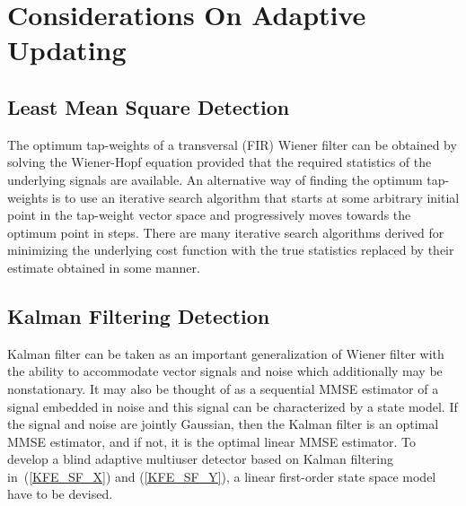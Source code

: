 \documentclass[a4paper,11pt,fleqn]{article}
\begin{document}
\pagebreak

\section{ Considerations On Adaptive Updating}

\begin{figure}
\label{AMUDstruct}
\end{figure}

\subsection{Least Mean Square Detection}

The optimum tap-weights of a transversal (FIR) Wiener filter can
be obtained by solving the Wiener-Hopf equation provided that the
required statistics of the underlying signals are available. An
alternative way of finding the optimum tap-weights is to use an
iterative search algorithm that starts at some arbitrary initial
point in the tap-weight vector space and progressively moves
towards the optimum point in steps. There are many iterative
search algorithms derived for minimizing the underlying cost
function with the true statistics replaced by their estimate
obtained in some manner.



\subsection{Kalman Filtering Detection} Kalman filter can be
taken as an important generalization of Wiener filter with the
ability to accommodate vector signals and noise which additionally
may be nonstationary. It may also be thought of as a sequential
MMSE estimator of a signal embedded in noise and this signal can
be characterized by a state model. If the signal and noise are
jointly Gaussian, then the Kalman filter is an optimal MMSE
estimator, and if not, it is the optimal linear MMSE estimator. To
develop a blind adaptive multiuser detector based on Kalman
filtering in~(\ref{KFE_SF_X}) and (\ref{KFE_SF_Y}), a linear
first-order state space model have to be devised.
\end{document}
